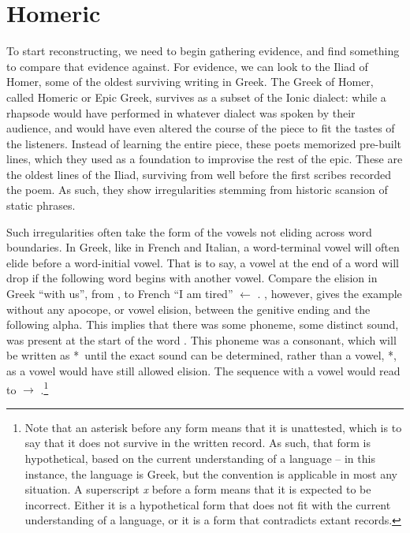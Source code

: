 \section{Homeric}\label{sec:Homeric}
To start reconstructing, we need to begin gathering evidence, and find something to compare that evidence against. For evidence, we can look to the Iliad of Homer, some of the oldest surviving writing in Greek. The Greek of Homer, called Homeric or Epic Greek, survives as a subset of the Ionic dialect: while a rhapsode would have performed in whatever dialect was spoken by their audience, and would have even altered the course of the piece to fit the tastes of the listeners. Instead of learning the entire piece, these poets memorized pre-built lines, which they used as a foundation to improvise the rest of the epic. These are the oldest lines of the Iliad, surviving from well before the first scribes recorded the poem. As such, they show irregularities stemming from historic scansion of static phrases.

Such irregularities often take the form of the vowels not eliding across word boundaries. In Greek, like in French and Italian, a word-terminal vowel will often elide before a word-initial vowel. That is to say, a vowel at the end of a word will drop if the following word begins with another vowel. Compare the elision in Greek   ``with us'', from , to French   ``I am tired'' $\gets$ . , however, gives the example  without any apocope, or vowel elision, between the genitive ending  and the following alpha.\autocite[XV.214]{Iliad_1999} This implies that there was some phoneme, some distinct sound, was present at the start of the word . This phoneme was a consonant, which will be written as *\w\ until the exact sound can be determined, rather than a vowel, *\vowel, as a vowel would have still allowed elision. The sequence with a vowel would read  to  $\to$ .\footnote{Note that an asterisk before any form means that it is unattested, which is to say that it does not survive in the written record. As such, that form is hypothetical, based on the current understanding of a language -- in this instance, the language is Greek, but the convention is applicable in most any situation. A superscript \textit{x} before a form means that it is expected to be incorrect. Either it is a hypothetical form that does not fit with the current understanding of a language, or it is a form that contradicts extant records.}

